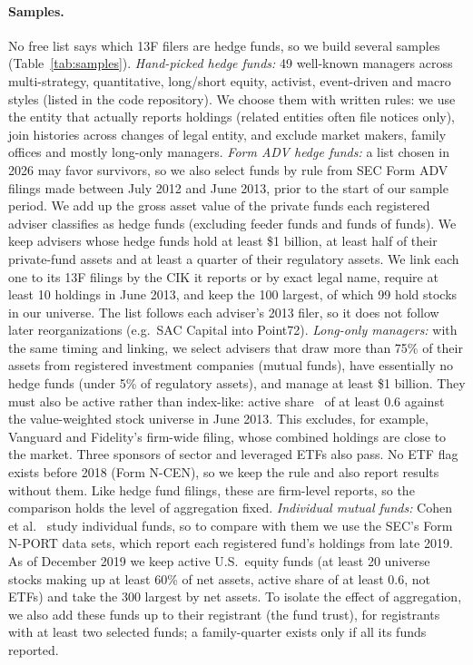 \paragraph{Samples.} No free list says which 13F filers are hedge funds, so
we build several samples (Table~\ref{tab:samples}).
\emph{Hand-picked hedge funds:} 49 well-known managers across multi-strategy,
quantitative, long/short equity, activist, event-driven and macro styles
(listed in the code repository). We choose them with written rules: we use
the entity that actually reports holdings (related entities often file notices
only), join histories across changes of legal entity, and exclude market
makers, family offices and mostly long-only managers.
\emph{Form ADV hedge funds:} a list chosen in 2026 may favor survivors, so we
also select funds by rule from SEC Form ADV filings made between July 2012 and
June 2013, prior to the start of our sample period. We add up the gross asset value of the
private funds each registered adviser classifies as hedge funds (excluding
feeder funds and funds of funds). We keep advisers whose hedge funds hold at
least \$1 billion, at least half of their private-fund assets and at least a
quarter of their regulatory assets. We link each one to its 13F filings by the
CIK it reports or by exact legal name, require at least 10 holdings in June
2013, and keep the 100 largest, of which 99 hold stocks in our universe. The
list follows each adviser's 2013 filer, so it does not follow later
reorganizations (e.g.\ SAC Capital into Point72).
\emph{Long-only managers:} with the same timing and linking, we select
advisers that draw more than 75\% of their assets from registered investment
companies (mutual funds), have essentially no hedge funds (under 5\% of
regulatory assets), and manage at least \$1 billion. They must also be active
rather than index-like: active share~\cite{cremers2009active} of at least 0.6
against the value-weighted stock universe in June 2013. This excludes, for
example, Vanguard and Fidelity's firm-wide filing, whose combined holdings are
close to the market. Three sponsors of sector and leveraged ETFs also pass.
No ETF flag exists before 2018 (Form N-CEN), so we keep the rule and also
report results without them. Like hedge fund filings, these are firm-level
reports, so the comparison holds the level of aggregation fixed.
\emph{Individual mutual funds:} Cohen et al.~\cite{cohen2026mimicking} study
individual funds, so to compare with them we use the SEC's Form N-PORT data
sets, which report each registered fund's holdings from late 2019. As of
December 2019 we keep active U.S.\ equity funds (at least 20 universe stocks
making up at least 60\% of net assets, active share of at least 0.6, not ETFs)
and take the 300 largest by net assets. To isolate the effect of aggregation,
we also add these funds up to their registrant (the fund trust), for
registrants with at least two selected funds; a family-quarter exists only if
all its funds reported.

